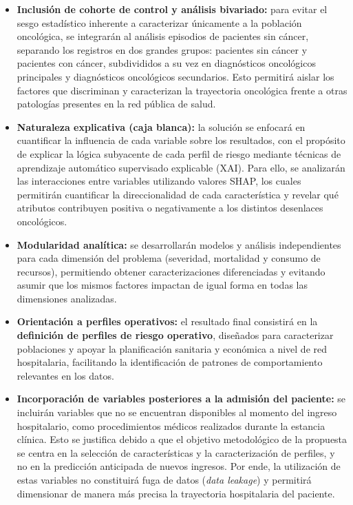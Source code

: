 \begin{itemize}
\item \textbf{Inclusión de cohorte de control y análisis bivariado:} para evitar el sesgo estadístico inherente a caracterizar únicamente a la población oncológica, se integrarán al análisis episodios de pacientes sin cáncer, separando los registros en dos grandes grupos: pacientes sin cáncer y pacientes con cáncer, subdivididos a su vez en diagnósticos oncológicos principales y diagnósticos oncológicos secundarios. Esto permitirá aislar los factores que discriminan y caracterizan la trayectoria oncológica frente a otras patologías presentes en la red pública de salud.

\item \textbf{Naturaleza explicativa (caja blanca):} la solución se enfocará en cuantificar la influencia de cada variable sobre los resultados, con el propósito de explicar la lógica subyacente de cada perfil de riesgo mediante técnicas de aprendizaje automático supervisado explicable (XAI). Para ello, se analizarán las interacciones entre variables utilizando valores SHAP, los cuales permitirán cuantificar la direccionalidad de cada característica y revelar qué atributos contribuyen positiva o negativamente a los distintos desenlaces oncológicos.

\item \textbf{Modularidad analítica:} se desarrollarán modelos y análisis independientes para cada dimensión del problema (severidad, mortalidad y consumo de recursos), permitiendo obtener caracterizaciones diferenciadas y evitando asumir que los mismos factores impactan de igual forma en todas las dimensiones analizadas.

\item \textbf{Orientación a perfiles operativos:} el resultado final consistirá en la \textbf{definición de perfiles de riesgo operativo}, diseñados para caracterizar poblaciones y apoyar la planificación sanitaria y económica a nivel de red hospitalaria, facilitando la identificación de patrones de comportamiento relevantes en los datos.

\item \textbf{Incorporación de variables posteriores a la admisión del paciente:} se incluirán variables que no se encuentran disponibles al momento del ingreso hospitalario, como procedimientos médicos realizados durante la estancia clínica. Esto se justifica debido a que el objetivo metodológico de la propuesta se centra en la selección de características y la caracterización de perfiles, y no en la predicción anticipada de nuevos ingresos. Por ende, la utilización de estas variables no constituirá fuga de datos (\textit{data leakage}) y permitirá dimensionar de manera más precisa la trayectoria hospitalaria del paciente.


\end{itemize}
